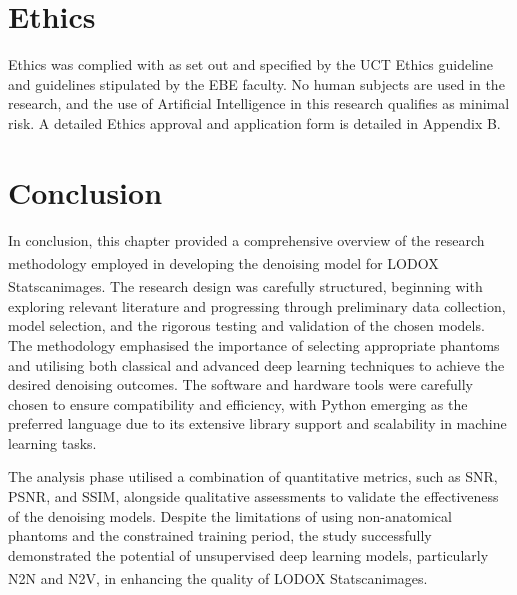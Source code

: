 \section{Ethics}
Ethics was complied with as set out and specified by the UCT Ethics guideline and guidelines stipulated by the EBE faculty. No human subjects are used in the research, and the use of Artificial Intelligence in this research qualifies as minimal risk. A detailed Ethics approval and application form is detailed in Appendix B. 



\section{Conclusion}
In conclusion, this chapter provided a comprehensive overview of the research methodology employed in developing the denoising model for LODOX\textsuperscript{\textregistered} Statscan\textsuperscript{\textregistered}images. The research design was carefully structured, beginning with exploring relevant literature and progressing through preliminary data collection, model selection, and the rigorous testing and validation of the chosen models. The methodology emphasised the importance of selecting appropriate phantoms and utilising both classical and advanced deep learning techniques to achieve the desired denoising outcomes. The software and hardware tools were carefully chosen to ensure compatibility and efficiency, with Python emerging as the preferred language due to its extensive library support and scalability in machine learning tasks.

The analysis phase utilised a combination of quantitative metrics, such as \gls{SNR}, \gls{PSNR}, and \gls{SSIM}, alongside qualitative assessments to validate the effectiveness of the denoising models. Despite the limitations of using non-anatomical phantoms and the constrained training period, the study successfully demonstrated the potential of unsupervised deep learning models, particularly \gls{N2N} and \gls{N2V}, in enhancing the quality of LODOX\textsuperscript{\textregistered} Statscan\textsuperscript{\textregistered}images. 

